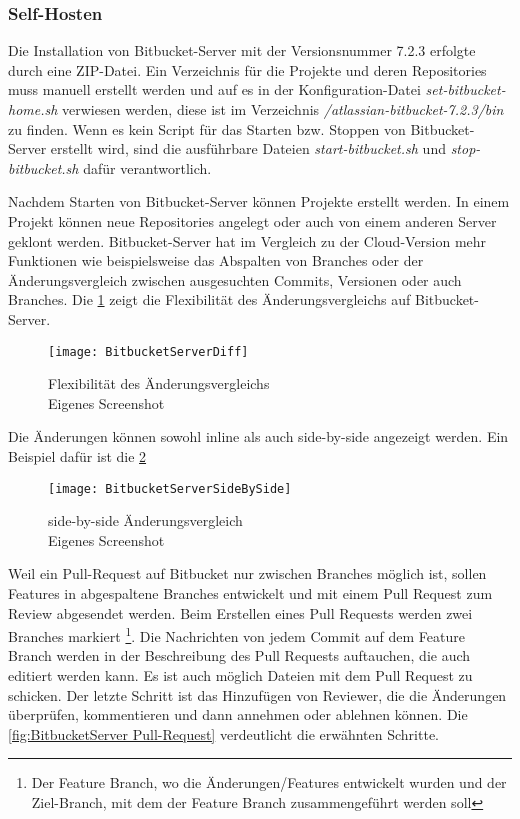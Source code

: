\subsubsection{Self-Hosten}
\label{subsubsec:Bitbucket-self-host} 

Die Installation von Bitbucket-Server mit der Versionsnummer 7.2.3 erfolgte durch eine ZIP-Datei. Ein Verzeichnis für die Projekte und deren Repositories muss manuell erstellt werden und auf es in der Konfiguration-Datei \textit{set-bitbucket-home.sh} verwiesen werden, diese ist im Verzeichnis \textit{/atlassian-bitbucket-7.2.3/bin} zu finden. Wenn es kein Script für das Starten bzw. Stoppen von Bitbucket-Server erstellt wird, sind die ausführbare Dateien \textit{start-bitbucket.sh} und \textit{stop-bitbucket.sh} dafür verantwortlich.

Nachdem Starten von Bitbucket-Server können Projekte erstellt werden. In einem Projekt können neue Repositories angelegt oder auch von einem anderen Server geklont werden.
Bitbucket-Server hat im Vergleich zu der Cloud-Version mehr Funktionen wie beispielsweise das Abspalten von Branches oder der Änderungsvergleich zwischen ausgesuchten Commits, Versionen oder auch Branches. Die \cref{fig:Flexibilität des Änderungsvergleich} zeigt die Flexibilität des Änderungsvergleichs auf Bitbucket-Server.

\begin{figure}[H]
	\centering
	\texttt{[image: BitbucketServerDiff]}
	\caption[Flexibilität des Änderungsvergleichs auf Bitbucket-Server]{Flexibilität des Änderungsvergleichs \\Eigenes Screenshot}
	\label{fig:Flexibilität des Änderungsvergleich}
\end{figure}

Die Änderungen können sowohl inline als auch side-by-side angezeigt werden. Ein Beispiel dafür ist die \cref{fig:BitbucketServerSideBySide}

\begin{figure}[H]
	\centering
	\texttt{[image: BitbucketServerSideBySide]}
	\caption[Side-by-side Änderungsvergleich auf Bitbucket-Server]{side-by-side Änderungsvergleich\\Eigenes Screenshot}
	\label{fig:BitbucketServerSideBySide}
\end{figure}

Weil ein Pull-Request auf Bitbucket nur zwischen Branches möglich ist, sollen Features in abgespaltene Branches entwickelt und mit einem Pull Request zum Review abgesendet werden. Beim Erstellen eines Pull Requests werden zwei Branches markiert \footnote{Der Feature Branch, wo die Änderungen/Features entwickelt wurden und der Ziel-Branch, mit dem der Feature Branch zusammengeführt werden soll}. Die Nachrichten von jedem Commit auf dem Feature Branch werden in der Beschreibung des Pull Requests auftauchen, die auch editiert werden kann. Es ist auch möglich Dateien mit dem Pull Request zu schicken.
Der letzte Schritt ist das Hinzufügen von Reviewer, die die Änderungen überprüfen, kommentieren und dann annehmen oder ablehnen können. Die \cref{fig:BitbucketServer Pull-Request} verdeutlicht die erwähnten Schritte.

